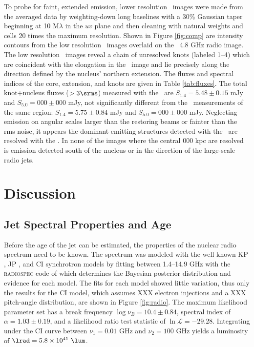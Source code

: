 \documentclass[11pt, preprint]{aastex}
\begin{document}
To probe for faint, extended emission, lower resolution \vlba\ images
were made from the averaged data by weighting-down long baselines with
a 30\% Gaussian taper beginning at 10 M$\lambda$ in the $uv$ plane and
then cleaning with natural weights and cells 20 times the maximum
resolution. Shown in Figure \ref{fig:comp} are intensity contours from
the low resolution \vlba\ images overlaid on the \vla\ 4.8 GHz radio
image. The low resolution \vlba\ images reveal a chain of unresolved
knots (labeled 1--4) which are coincident with the elongation in the
\vla\ image and lie precisely along the direction defined by the
nucleus' northern extension. The fluxes and spectral indices of the
core, extension, and knots are given in Table \ref{tab:fluxes}. The
total knot+nucleus fluxes ($> 3\srms$) measured with the \vlba\ are
$S_{1.4} = 5.48 \pm 0.15$ mJy and $S_{5.0} = 000 \pm 000$ mJy, not
significantly different from the \vla\ measurements of the same
region: $S_{1.4} = 5.75 \pm 0.84$ mJy and $S_{5.0} = 000 \pm 000$
mJy. Neglecting emission on angular scales larger than the restoring
beams or fainter than the rms noise, it appears the dominant emitting
structures detected with the \vla\ are resolved with the \vlba. In
none of the images where the central 000 kpc are resolved is emission
detected south of the nucleus or in the direction of the large-scale
radio jets.

\section{Discussion}
\label{sec:dis}

\subsection{Jet Spectral Properties and Age}
\label{sec:age}

Before the age of the jet can be estimated, the properties of the
nuclear radio spectrum need to be known. The spectrum was modeled with
the well-known KP \citep{1962SvA.....6..317K, pach}, JP
\citep{1973A&A....26..423J}, and CI \citep{1987MNRAS.225..335H}
synchrotron models by fitting between 1.4--14.9 GHz with the
{\textsc{radiospec}} code of \citet{2009arXiv0912.2317N} which
determines the Bayesian posterior distribution and evidence for each
model. The fits for each model showed little variation, thus only the
results for the CI model, which assumes XXX electron injections and a
XXX pitch-angle distribution, are shown in Figure \ref{fig:radio}. The
maximum likelihood parameter set has a break frequency $\log \nu_B =
10.4 \pm 0.84$, spectral index of $\alpha = 1.03 \pm 0.19$, and a
likelihood ratio test statistic of $\ln \mathcal{L} =
-29.28$. Integrating under the CI curve between $\nu_1 = 0.01$ GHz and
$\nu_2 = 100$ GHz yields a luminosity of $\lrad = 5.8 \times 10^{41}
~\lum$.
\end{document}
